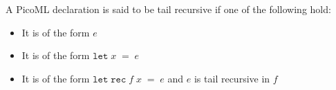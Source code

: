 \begin{definition}
\label{def:dectailrec}
A PicoML declaration is said to be tail recursive if one of the following hold:
\begin{itemize}
 \item It is of the form $e$
 \item It is of the form $\mathtt{let} \; x \; \mathtt{=} \; e$
 \item It is of the form $\mathtt{let} \; \mathtt{rec} \; f \; x \; \mathtt{=} \; e$ and $e$ is tail recursive in $f$
\end{itemize}
\end{definition}
